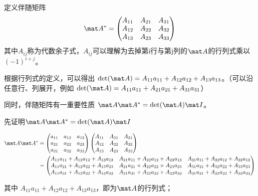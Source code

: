 定义伴随矩阵
\begin{equation}
\mat A^*=
\begin{pmatrix}
A_{11}&A_{21}&A_{31}\\
A_{12}&A_{22}&A_{32}\\
A_{13}&A_{23}&A_{33}\\
\end{pmatrix}
\end{equation}
其中$A_{ij}$称为代数余子式，$A_{ij}$可以理解为去掉第i行与第j列的$\mat A$的行列式乘以$(-1)^{i+j}$。

根据行列式的定义，可以得出 $\det(\mat A) = A_{11}a_{11}+A_{12}a_{12}+A_{13}a_{13}$。（可以沿任意行、列展开，例如 $\det(\mat A) = A_{11}a_{11}+A_{21}a_{21}+A_{31}a_{31}$）

同时，伴随矩阵有一重要性质 $\mat A \mat A^* = \det(\mat A)\mat I$。

先证明$\mat A \mat A^* = \det(\mat A)\mat I$

\begin{equation}
\begin{aligned}
\mat A \mat A^* &=
\begin{pmatrix}
a_{11}&a_{12}&a_{13}\\
a_{21}&a_{22}&a_{23}\\
a_{31}&a_{32}&a_{33}\\
\end{pmatrix}
\begin{pmatrix}
A_{11}&A_{21}&A_{31}\\
A_{12}&A_{22}&A_{32}\\
A_{13}&A_{23}&A_{33}\\
\end{pmatrix}\\
&=
\begin{pmatrix}
A_{11}a_{11}+A_{12}a_{12}+A_{13}a_{13}&A_{21}a_{11}+A_{22}a_{12}+A_{23}a_{13}&A_{31}a_{11}+A_{32}a_{12}+A_{33}a_{13}\\
A_{11}a_{21}+A_{12}a_{22}+A_{13}a_{23}&A_{21}a_{21}+A_{22}a_{22}+A_{23}a_{23}&A_{31}a_{21}+A_{32}a_{22}+A_{33}a_{23}\\
A_{11}a_{31}+A_{12}a_{32}+A_{13}a_{33}&A_{21}a_{31}+A_{22}a_{32}+A_{23}a_{33}&A_{31}a_{31}+A_{32}a_{32}+A_{33}a_{33}\\
\end{pmatrix}
\end{aligned}
\end{equation}

其中
$
A_{11}a_{11}+A_{12}a_{12}+A_{13}a_{13}
$，即为$\mat A$的行列式；

